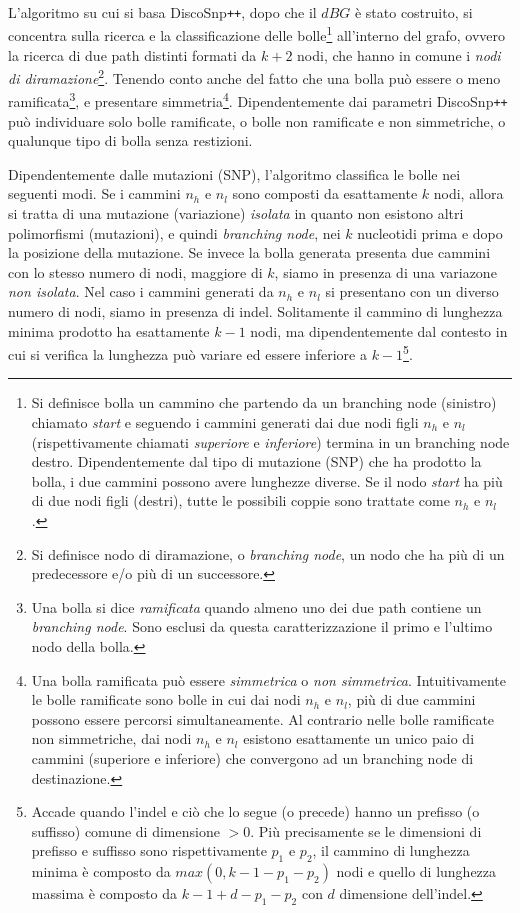 \documentclass[../main.tex]{subfiles}
\begin{document}
\paragraph{}
L'algoritmo su cui si basa DiscoSnp\texttt{++}, dopo che il $dBG$ è stato costruito, si concentra sulla ricerca e la classificazione delle bolle\footnote{Si definisce bolla un cammino che partendo da un branching node (sinistro) chiamato \textit{start} e seguendo i cammini generati dai due nodi figli $n_h$ e $n_l$ (rispettivamente chiamati \textit{superiore} e \textit{inferiore}) termina in un branching node destro. Dipendentemente dal tipo di mutazione (SNP) che ha prodotto la bolla, i due cammini possono avere lunghezze diverse. Se il nodo \textit{start} ha più di due nodi figli (destri), tutte le possibili coppie sono trattate come $n_h$ e $n_l$.} all'interno del grafo, ovvero la ricerca di due path distinti formati da $k+2$ nodi, che hanno in comune i \textit{nodi di diramazione}\footnote{Si definisce nodo di diramazione, o \textit{branching node}, un nodo che ha più di un predecessore e/o più di un successore.}. Tenendo conto anche del fatto che una bolla può essere o meno ramificata\footnote{Una bolla si dice \textit{ramificata} quando almeno uno dei due path contiene un \textit{branching node}. Sono esclusi da questa caratterizzazione il primo e l'ultimo nodo della bolla.}, e presentare simmetria\footnote{Una bolla ramificata può essere \textit{simmetrica} o \textit{non simmetrica}. Intuitivamente le bolle ramificate sono bolle in cui dai nodi $n_h$ e $n_l$, più di due cammini possono essere percorsi simultaneamente. Al contrario nelle bolle ramificate non simmetriche, dai nodi $n_h$ e $n_l$ esistono esattamente un unico paio di cammini (superiore e inferiore) che convergono ad un branching node di destinazione.}. Dipendentemente dai parametri DiscoSnp\texttt{++} può individuare solo bolle ramificate, o bolle non ramificate e non simmetriche, o qualunque tipo di bolla senza restizioni.

Dipendentemente dalle mutazioni (SNP), l'algoritmo classifica le bolle nei seguenti modi. Se i cammini $n_h$ e $n_l$ sono composti da esattamente $k$ nodi, allora si tratta di una mutazione (variazione) \textit{isolata} in quanto non esistono altri polimorfismi (mutazioni), e quindi \textit{branching node}, nei $k$ nucleotidi prima e dopo la posizione della mutazione. Se invece la bolla generata presenta due cammini con lo stesso numero di nodi, maggiore di $k$, siamo in presenza di una variazone \textit{non isolata}. Nel caso i cammini generati da $n_h$ e $n_l$ si presentano con un diverso numero di nodi, siamo in presenza di indel. Solitamente il cammino di lunghezza minima prodotto ha esattamente $k-1$ nodi, ma dipendentemente dal contesto in cui si verifica la lunghezza può variare ed essere inferiore a $k-1$\footnote{Accade quando l'indel e ciò che lo segue (o precede) hanno un prefisso (o suffisso) comune di dimensione $> 0$. Più precisamente se le dimensioni di prefisso e suffisso sono rispettivamente $p_1$ e $p_2$, il cammino di lunghezza minima è composto da $max(0, k-1-p_1 - p_2)$ nodi e quello di lunghezza massima è composto da $k-1+d-p_1 - p_2$ con $d$ dimensione dell'indel.}.
\end{document}
